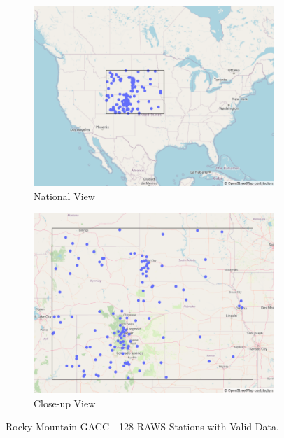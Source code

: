 \documentclass[11pt]{article}%
\begin{document}
\begin{figure}[h]
    \centering
    \begin{subfigure}[b]{0.45\textwidth}
        \centering
        \includegraphics[width=\textwidth]{images/raws2.png}
        \caption{National View}
    \end{subfigure}
    \hspace{0.05\textwidth} %
    \begin{subfigure}[b]{0.45\textwidth}
        \centering
        \includegraphics[width=\textwidth]{images/raws.png}
        \caption{Close-up View}
    \end{subfigure}
    \caption{Rocky Mountain GACC - 128 RAWS Stations with Valid Data.}
    \label{fig:raws_map}
\end{figure}
\end{document}
